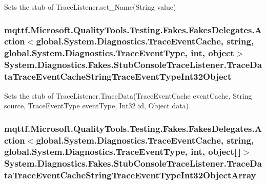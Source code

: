 Sets the stub of Trace\-Listener.\-set\-\_\-\-Name(\-String value)

\hypertarget{class_system_1_1_diagnostics_1_1_fakes_1_1_stub_console_trace_listener_a5166016cbd703ff6bf9ee37510ea2070}{
\subsubsection[{Trace\-Data\-Trace\-Event\-Cache\-String\-Trace\-Event\-Type\-Int32\-Object}]{\setlength{\rightskip}{0pt plus 5cm}mqttf.\-Microsoft.\-Quality\-Tools.\-Testing.\-Fakes.\-Fakes\-Delegates.\-Action$<$global.\-System.\-Diagnostics.\-Trace\-Event\-Cache, string, global.\-System.\-Diagnostics.\-Trace\-Event\-Type, int, object$>$ System.\-Diagnostics.\-Fakes.\-Stub\-Console\-Trace\-Listener.\-Trace\-Data\-Trace\-Event\-Cache\-String\-Trace\-Event\-Type\-Int32\-Object}}\label{class_system_1_1_diagnostics_1_1_fakes_1_1_stub_console_trace_listener_a5166016cbd703ff6bf9ee37510ea2070}


Sets the stub of Trace\-Listener.\-Trace\-Data(\-Trace\-Event\-Cache event\-Cache, String source, Trace\-Event\-Type event\-Type, Int32 id, Object data)

\hypertarget{class_system_1_1_diagnostics_1_1_fakes_1_1_stub_console_trace_listener_a403d1f10e1c31996ba56f1d44f189f17}{
\subsubsection[{Trace\-Data\-Trace\-Event\-Cache\-String\-Trace\-Event\-Type\-Int32\-Object\-Array}]{\setlength{\rightskip}{0pt plus 5cm}mqttf.\-Microsoft.\-Quality\-Tools.\-Testing.\-Fakes.\-Fakes\-Delegates.\-Action$<$global.\-System.\-Diagnostics.\-Trace\-Event\-Cache, string, global.\-System.\-Diagnostics.\-Trace\-Event\-Type, int, object\mbox{[}$\,$\mbox{]}$>$ System.\-Diagnostics.\-Fakes.\-Stub\-Console\-Trace\-Listener.\-Trace\-Data\-Trace\-Event\-Cache\-String\-Trace\-Event\-Type\-Int32\-Object\-Array}}\label{class_system_1_1_diagnostics_1_1_fakes_1_1_stub_console_trace_listener_a403d1f10e1c31996ba56f1d44f189f17}


